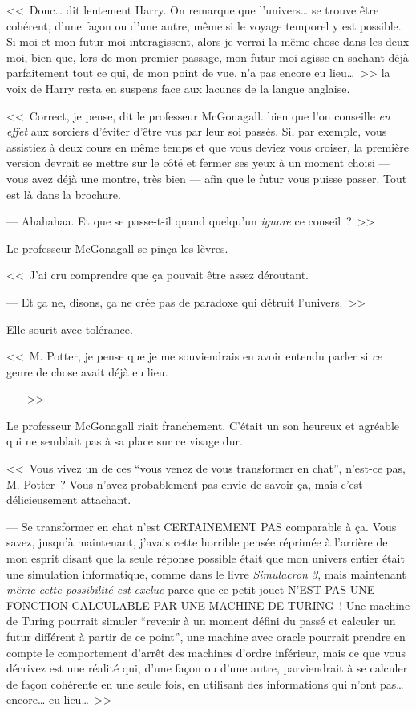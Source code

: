 <<~Donc… dit lentement Harry. On remarque que l'univers… se trouve être cohérent, d'une façon ou d'une autre, même si le voyage temporel y est possible. Si moi et mon futur moi interagissent, alors je verrai la même chose dans les deux moi, bien que, lors de mon premier passage, mon futur moi agisse en sachant déjà parfaitement tout ce qui, de mon point de vue, n'a pas encore eu lieu…~>> la voix de Harry resta en suspens face aux lacunes de la langue anglaise.

<<~Correct, je pense, dit le professeur McGonagall. bien que l'on conseille \emph{en effet} aux sorciers d'éviter d'être vus par leur soi passés. Si, par exemple, vous assistiez à deux cours en même temps et que vous deviez vous croiser, la première version devrait se mettre sur le côté et fermer ses yeux à un moment choisi — vous avez déjà une montre, très bien — afin que le futur vous puisse passer. Tout est là dans la brochure.

--- Ahahahaa. Et que se passe-t-il quand quelqu'un \emph{ignore} ce conseil~?~>>

Le professeur McGonagall se pinça les lèvres.

<<~J'ai cru comprendre que ça pouvait être assez déroutant.

--- Et ça ne, disons, ça ne crée pas de paradoxe qui détruit l'univers.~>>

Elle sourit avec tolérance.

<<~M. Potter, je pense que je me souviendrais en avoir entendu parler si \emph{ce} genre de chose avait déjà eu lieu.

--- ~>>

Le professeur McGonagall riait franchement. C'était un son heureux et agréable qui ne semblait pas à sa place sur ce visage dur.

<<~Vous vivez un de ces “vous venez de vous transformer en chat”, n'est-ce pas, M. Potter~? Vous n'avez probablement pas envie de savoir ça, mais c'est délicieusement attachant.

--- Se transformer en chat n'est CERTAINEMENT PAS comparable à ça. Vous savez, jusqu'à maintenant, j'avais cette horrible pensée réprimée à l'arrière de mon esprit disant que la seule réponse possible était que mon univers entier était une simulation informatique, comme dans le livre \emph{Simulacron 3}, mais maintenant \emph{même cette possibilité est exclue} parce que ce petit jouet N'EST PAS UNE FONCTION CALCULABLE PAR UNE MACHINE DE TURING~! Une machine de Turing pourrait simuler “revenir à un moment défini du passé et calculer un futur différent à partir de ce point”, une machine avec oracle pourrait prendre en compte le comportement d'arrêt des machines d'ordre inférieur, mais ce que vous décrivez est une réalité qui, d'une façon ou d'une autre, parviendrait à se calculer de façon cohérente en une seule fois, en utilisant des informations qui n'ont pas… encore… eu lieu…~>>


